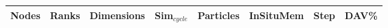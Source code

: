 \begingroup
\setlength{\tabcolsep}{-2pt}
\begin{table*}[!t]
\begin{tabular}{|P{1.1cm}|P{1.1cm}|P{2.7cm}|P{1.3cm}|P{1.5cm}|P{1.9cm}|P{1.7cm}|P{1.7cm}|}
\hline
Nodes & Ranks & Dimensions & \textbf{Sim$_{cycle}$} & Particles & \textbf{InSituMem} & \textbf{Step} & \textbf{DAV\%} \\ 
\hline

\end{tabular}
\end{table*}
